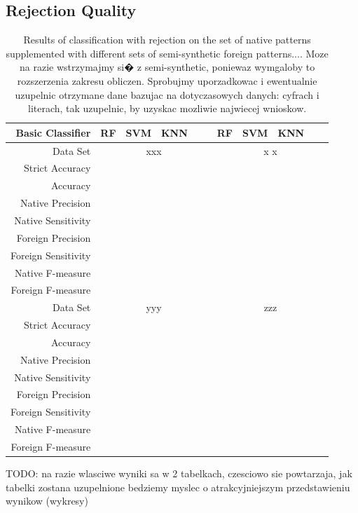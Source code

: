 \documentclass{llncs}
\begin{document}
\subsection{Rejection Quality}

\begin{table}[!ht]
\centering
\caption{Results of classification with rejection on the set of native patterns supplemented with different sets of semi-synthetic foreign patterns.... \color{red}Moze na razie wstrzymajmy si� z semi-synthetic, poniewaz wymgaloby to rozszerzenia zakresu obliczen. Sprobujmy uporzadkowac i ewentualnie uzupelnic otrzymane dane bazujac na dotyczasowych danych: cyfrach i literach, tak uzupelnic, by uzyskac mozliwie najwiecej wnioskow.}
\setlength{\tabcolsep}{4pt}
\renewcommand{\arraystretch}{1}
\begin{tabular}{||r||ccccc||ccccc||}
\hline
  Basic Classifier & RF & SVM & KNN &  &  &  RF & SVM & KNN &  &  \\
\hline
  Data Set & \multicolumn{5}{c||}{ xxx } & \multicolumn{5}{c|}{ x x } \\
\hline
\hline
Strict Accuracy     &&&&&&&&&& \\
Accuracy            &&&&&&&&&& \\
Native Precision    &&&&&&&&&&  \\
Native Sensitivity  &&&&&&&&&&  \\
Foreign Precision   &&&&&&&&&&  \\
Foreign Sensitivity &&&&&&&&&&  \\
Native F-measure    &&&&&&&&&& \\
Foreign F-measure   &&&&&&&&&&  \\
\hline
\hline
  Data Set & \multicolumn{5}{c||}{ yyy } & \multicolumn{5}{c|}{ zzz } \\
\hline
\hline
Strict Accuracy     &&&&&&&&&&  \\
Accuracy            &&&&&&&&&& \\
Native Precision    &&&&&&&&&&  \\
Native Sensitivity  &&&&&&&&&&  \\
Foreign Precision   &&&&&&&&&&  \\
Foreign Sensitivity &&&&&&&&&& \\
Native F-measure    &&&&&&&&&&  \\
Foreign F-measure   &&&&&&&&&&  \\
   \hline
\end{tabular}
\label{tab:rejection_results}
\end{table}
{\color{blue}
TODO: na razie wlasciwe wyniki sa w 2 tabelkach, czesciowo sie powtarzaja, jak tabelki zostana uzupelnione bedziemy myslec o atrakcyjniejszym przedstawieniu wynikow (wykresy)
}
\end{document}
